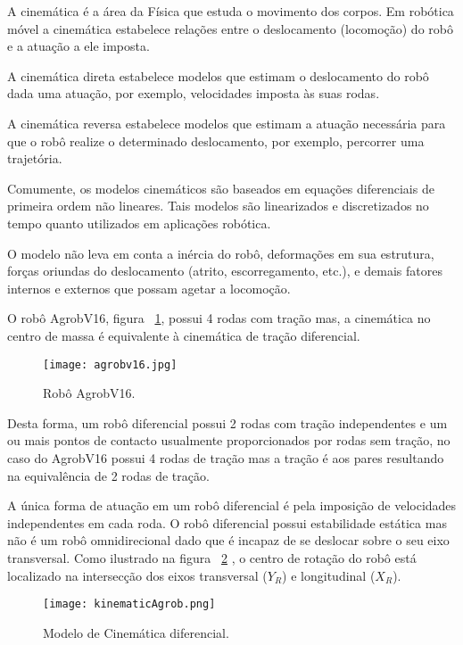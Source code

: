 A cinemática é a área da Física que estuda o movimento dos corpos. Em robótica móvel a cinemática estabelece relações entre o deslocamento (locomoção) do robô e a atuação a ele imposta.

A cinemática direta estabelece modelos que estimam o deslocamento do robô dada uma atuação, por exemplo, velocidades imposta às suas rodas. 

A cinemática reversa estabelece modelos que estimam a atuação necessária para que o robô realize o determinado deslocamento, por exemplo, percorrer uma trajetória.

Comumente, os modelos cinemáticos são baseados em equações diferenciais de primeira ordem não lineares. Tais modelos são linearizados e discretizados no tempo quanto utilizados em aplicações robótica.


O modelo não leva em conta a inércia do robô, deformações em sua estrutura, forças oriundas do deslocamento (atrito, escorregamento, etc.), e demais fatores internos e externos que possam agetar a locomoção.


O robô AgrobV16, figura ~\ref{fig:agrobv16}, possui 4 rodas com tração mas, a cinemática no centro de massa é equivalente à cinemática de tração diferencial. 

\begin{figure}[h!] %
	\begin{center}
		\leavevmode		
		\texttt{[image: agrobv16.jpg]}
		\caption{Robô AgrobV16.}
		\label{fig:agrobv16}
	\end{center}
\end{figure}


Desta forma, um robô diferencial possui 2 rodas com tração independentes e um ou mais pontos de contacto usualmente proporcionados por rodas sem tração, no caso do AgrobV16 possui 4 rodas de tração mas a tração é aos pares resultando na equivalência de 2 rodas de tração.

A única forma de atuação em um robô diferencial é pela imposição de velocidades independentes em cada roda. O robô diferencial possui estabilidade estática mas não é um robô omnidirecional dado que é incapaz de se deslocar sobre o seu eixo transversal. Como ilustrado na figura ~\ref{fig:kinematicAgrob} , o centro de rotação do robô está localizado na intersecção dos eixos transversal (\textbf{$Y_R$}) e longitudinal (\textbf{$X_R$}).

\begin{figure}[h!] %
	\begin{center}
		\leavevmode		
		\texttt{[image: kinematicAgrob.png]}
		\caption{Modelo de Cinemática diferencial.}
		\label{fig:kinematicAgrob}
	\end{center}
\end{figure}

